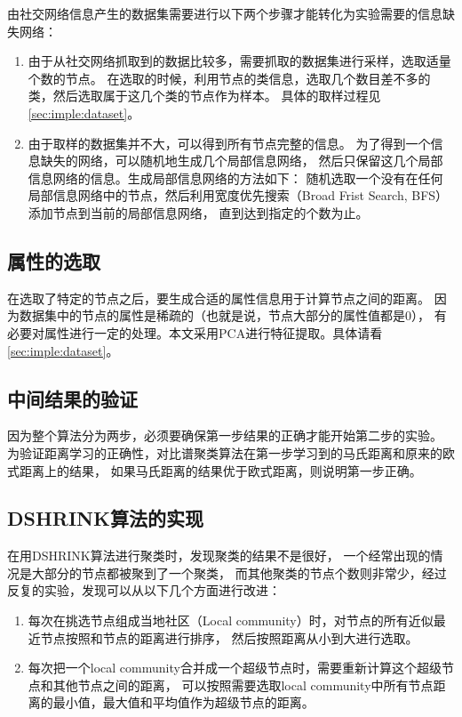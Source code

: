 由社交网络信息产生的数据集需要进行以下两个步骤才能转化为实验需要的信息缺失网络：

\begin{enumerate}
\item 由于从社交网络抓取到的数据比较多，需要抓取的数据集进行采样，选取适量个数的节点。
在选取的时候，利用节点的类信息，选取几个数目差不多的类，然后选取属于这几个类的节点作为样本。
具体的取样过程见\ref{sec:imple:dataset}。
\item 由于取样的数据集并不大，可以得到所有节点完整的信息。
为了得到一个信息缺失的网络，可以随机地生成几个局部信息网络，
然后只保留这几个局部信息网络的信息。生成局部信息网络的方法如下：
随机选取一个没有在任何局部信息网络中的节点，然后利用宽度优先搜索（Broad Frist Search, BFS）添加节点到当前的局部信息网络，
直到达到指定的个数为止。
\end{enumerate}


\subsection{属性的选取}

在选取了特定的节点之后，要生成合适的属性信息用于计算节点之间的距离。
因为数据集中的节点的属性是稀疏的（也就是说，节点大部分的属性值都是0），
有必要对属性进行一定的处理。本文采用PCA进行特征提取。具体请看\ref{sec:imple:dataset}。

\subsection{中间结果的验证}

因为整个算法分为两步，必须要确保第一步结果的正确才能开始第二步的实验。
为验证距离学习的正确性，对比谱聚类算法在第一步学习到的马氏距离和原来的欧式距离上的结果，
如果马氏距离的结果优于欧式距离，则说明第一步正确。

\subsection{DSHRINK算法的实现}

在用DSHRINK算法进行聚类时，发现聚类的结果不是很好，
一个经常出现的情况是大部分的节点都被聚到了一个聚类，
而其他聚类的节点个数则非常少，经过反复的实验，发现可以从以下几个方面进行改进：

\begin{enumerate}
\item 每次在挑选节点组成当地社区（Local community）时，对节点的所有近似最近节点按照和节点的距离进行排序，
然后按照距离从小到大进行选取。
\item 每次把一个local community合并成一个超级节点时，需要重新计算这个超级节点和其他节点之间的距离，
可以按照需要选取local community中所有节点距离的最小值，最大值和平均值作为超级节点的距离。
\end{enumerate}

